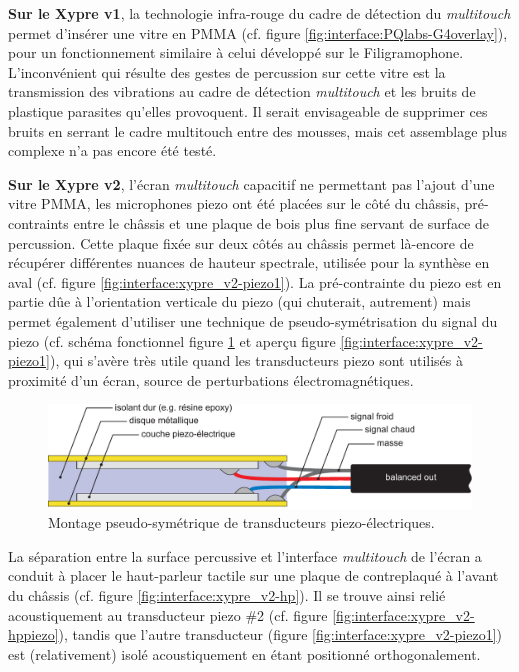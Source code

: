 \indent \textbf{Sur le Xypre v1}, la technologie infra-rouge du cadre de détection du \textit{multitouch} permet d'insérer une vitre en \gls{PMMA} (cf. figure \ref{fig:interface:PQlabs-G4overlay}), pour un fonctionnement similaire à celui développé sur le Filigramophone. L'inconvénient qui résulte des gestes de percussion sur cette vitre est la transmission des vibrations au cadre de détection \textit{multitouch} et les bruits de plastique parasites qu'elles provoquent. Il serait envisageable de supprimer ces bruits en serrant le cadre multitouch entre des mousses, mais cet assemblage plus complexe n'a pas encore été testé.

\indent \textbf{Sur le Xypre v2}, l'écran \textit{multitouch} capacitif ne permettant pas l'ajout d'une vitre \gls{PMMA}, les microphones piezo ont été placées sur le côté du châssis, pré-contraints entre le châssis et une plaque de bois plus fine servant de surface de percussion. Cette plaque fixée sur deux côtés au châssis permet là-encore de récupérer différentes nuances de hauteur spectrale, utilisée pour la synthèse en aval (cf. figure \ref{fig:interface:xypre_v2-piezo1}). La pré-contrainte du piezo est en partie dûe à l'orientation verticale du piezo (qui chuterait, autrement) mais permet également d'utiliser une technique de pseudo-symétrisation du signal du piezo (cf. schéma fonctionnel figure \ref{fig:interface:balancedPiezo} et aperçu figure \ref{fig:interface:xypre_v2-piezo1}), qui s'avère très utile quand les transducteurs piezo sont utilisés à proximité d'un écran, source de perturbations électromagnétiques.\\
\begin{figure}[!htbp]
	\captionsetup{format=plain}%
	\includegraphics[width=\textwidth]{gfx/05_interfaces/balancedPiezo.pdf}
	\caption[Montage pseudo-symétrique de transducteurs piezo-électriques]{Montage pseudo-symétrique de transducteurs piezo-électriques.}
	\label{fig:interface:balancedPiezo}
\end{figure}
\indent La séparation entre la surface percussive et l'interface \textit{multitouch} de l'écran a conduit à placer le haut-parleur tactile sur une plaque de contreplaqué à l'avant du châssis (cf. figure \ref{fig:interface:xypre_v2-hp}). Il se trouve ainsi relié acoustiquement au transducteur piezo \#2 (cf. figure \ref{fig:interface:xypre_v2-hppiezo}), tandis que l'autre transducteur (figure \ref{fig:interface:xypre_v2-piezo1}) est (relativement) isolé acoustiquement en étant positionné orthogonalement.

